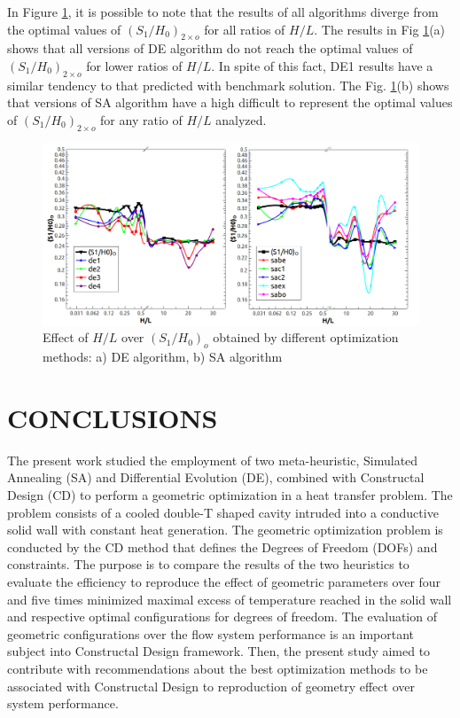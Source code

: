 \documentclass[12pt,fleqn]{article}
\begin{document}
In Figure \ref{figure08}, it is possible to note that the results of all algorithms diverge from the optimal values of ${(S_{1}/H_{0})_{2\times o}}$ for all ratios of $H/L$. The results in Fig \ref{figure08}(a) shows that all versions of DE algorithm do not reach the optimal values of ${(S_{1}/H_{0})_{2\times o}}$ for lower ratios of  $H/L$. In spite of this fact, DE1 results have a similar tendency to that predicted with benchmark solution. The Fig. \ref{figure08}(b) shows that versions of SA algorithm have a high difficult to represent the optimal values of ${(S_{1}/H_{0})_{2\times o}}$ for any ratio of  $H/L$ analyzed.
\begin{figure}[H]
\centering
\includegraphics[width=0.9\linewidth]{imgs/5dof/de_sa_hl_s1h0.png}
\caption{ {\small Effect of $H/L$ over ${(S_{1}/H_{0})_{o}}$ obtained by different optimization methods: a) DE algorithm, b) SA algorithm}}
\label{figure08}
\end{figure}

\section{CONCLUSIONS}

The present work studied the employment of two meta-heuristic, Simulated Annealing (SA) and Differential Evolution (DE), combined with Constructal Design (CD) to perform a geometric optimization in a heat transfer problem. The problem consists of a cooled double-T shaped cavity intruded into a conductive solid wall with constant heat generation. The geometric optimization problem is conducted by the CD method that defines the Degrees of Freedom (DOFs) and constraints. The purpose is to compare the results of the two heuristics to evaluate the efficiency to reproduce the effect of geometric parameters over four and five times minimized maximal excess of temperature reached in the solid wall and respective optimal configurations for degrees of freedom. The evaluation of geometric configurations over the flow system performance is an important subject into Constructal Design framework. Then, the present study aimed to contribute with recommendations about the best optimization methods to be associated with Constructal Design to reproduction of geometry effect over system performance.
\end{document}
